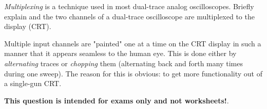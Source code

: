 

{\it Multiplexing} is a technique used in most dual-trace analog oscilloscopes.  Briefly explain  and  the two channels of a dual-trace oscilloscope are multiplexed to the display (CRT).







Multiple input channels are "painted" one at a time on the CRT display in such a manner that it appears seamless to the human eye.  This is done either by {\it alternating} traces or {\it chopping} them (alternating back and forth many times during one sweep).  The reason for this is obvious: to get more functionality out of a single-gun CRT.







{\bf This question is intended for exams only and not worksheets!}.




